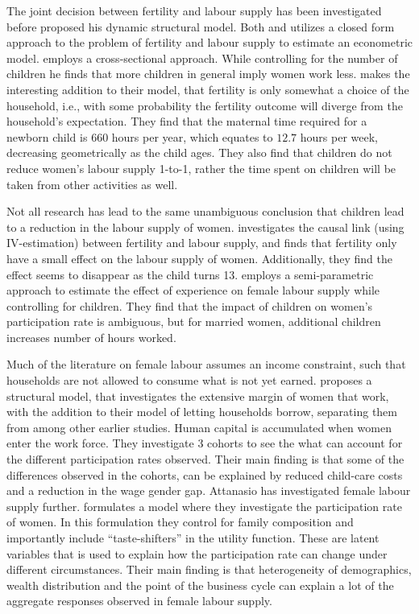 The joint decision between fertility and labour supply has been investigated before \textcite{francesconi_joint_2002} proposed his dynamic structural model. Both \textcite{moffitt_estimation_1984} and \textcite{hotz_empirical_1988} utilizes a closed form approach to the problem of fertility and labour supply to estimate an econometric model. \textcite{moffitt_estimation_1984} employs a cross-sectional approach. While controlling for the number of children he finds that more children in general imply women work less. \textcite{hotz_empirical_1988} makes the interesting addition to their model, that fertility is only somewhat a choice of the household, i.e., with some probability the fertility outcome will diverge from the household's expectation. They find that the maternal time required for a newborn child is 660 hours per year, which equates to $12.7$ hours per week, decreasing geometrically as the child ages. They also find that children do not reduce women's labour supply 1-to-1, rather the time spent on children will be taken from other activities as well.

Not all research has lead to the same unambiguous conclusion that children lead to a reduction in the labour supply of women.   \textcite{angrist_children_1996}  investigates the causal link (using IV-estimation) between fertility and labour supply, and finds that fertility only have a small effect on the labour supply of women. Additionally, they find the effect seems to disappear as the child turns 13.  \textcite{altug_effect_1998} employs a semi-parametric approach to estimate the effect of experience on female labour supply while controlling for children. They find that the impact of children on women's participation rate is ambiguous, but for married women, additional children increases number of hours worked.

Much of the literature on female labour assumes an income constraint, such that households are not allowed to consume what is not yet earned.  \textcite{attanasio_explaining_2008} proposes a structural model, that investigates the extensive margin of women that work, with the addition to their model  of letting households borrow, separating them from \textcite{francesconi_joint_2002} among other earlier studies. Human capital is accumulated when women enter the work force. They investigate 3 cohorts to see the what can account for the different participation rates observed. Their main finding is that some of the differences observed in the cohorts, can be explained by reduced child-care costs and a reduction in the wage gender gap. Attanasio has investigated female labour supply further.  \textcite{attanasio_aggregating_2018} formulates a model where they investigate the participation rate of women. In this formulation they control for family composition and importantly include ``taste-shifters'' in the utility function. These are latent variables that is used to explain how the participation rate can change under different circumstances. Their main finding is that heterogeneity of demographics, wealth distribution and the point of the business cycle can explain a lot of the aggregate responses observed in female labour supply.

